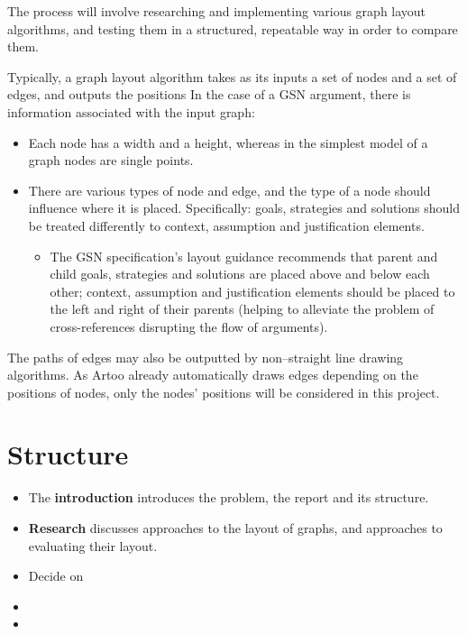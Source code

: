 The process will involve researching and implementing various graph layout algorithms,
and testing them in a structured, repeatable way in order to compare them. 

Typically, a graph layout algorithm takes as its inputs a set of nodes and a set of edges, and outputs the positions 
In the case of a GSN argument, there is  information associated with the input graph:

\begin{itemize}
  \item
    Each node has a width and a height, whereas in the simplest model of a graph nodes are single points. 
  \item
    There are various types of node and edge, and the type of a node should influence where it is placed. Specifically: goals, strategies and solutions should be treated differently to context, assumption and justification elements.
    \begin{itemize}
    \item The GSN specification's layout guidance \citep[section~2.2, pp.~26--27]{gsnstandard} recommends that parent and child goals, strategies and solutions are placed above and below each other; context, assumption and justification elements should be placed to the left and right of their parents (helping to alleviate the problem of cross-references disrupting the flow of arguments).
    \end{itemize}
\end{itemize}

The paths of edges may also be outputted by non--straight line drawing algorithms. As Artoo already automatically draws edges depending on the positions of nodes, only the nodes' positions will be considered in this project.


\section{Structure}

\begin{itemize}
\item The \textbf{introduction} introduces the problem, the report and its structure.
\item \textbf{Research} discusses approaches to the layout of graphs, and approaches to evaluating their layout.
\item Decide on
\item
\item
\end{itemize}


